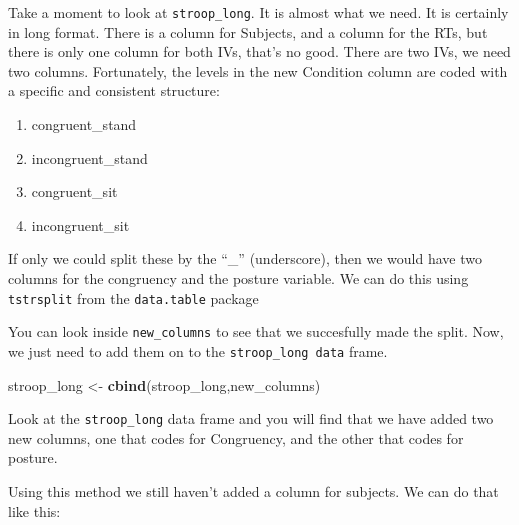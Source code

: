 \documentclass[
]{book}
\newenvironment{Shaded}{\begin{snugshade}}{\end{snugshade}}
\newcommand{\AttributeTok}[1]{\textcolor[rgb]{0.13,0.29,0.53}{#1}}
\newcommand{\FunctionTok}[1]{\textcolor[rgb]{0.13,0.29,0.53}{\textbf{#1}}}
\newcommand{\NormalTok}[1]{#1}
\newcommand{\OtherTok}[1]{\textcolor[rgb]{0.56,0.35,0.01}{#1}}
\newcommand{\SpecialCharTok}[1]{\textcolor[rgb]{0.81,0.36,0.00}{\textbf{#1}}}
\newcommand{\StringTok}[1]{\textcolor[rgb]{0.31,0.60,0.02}{#1}}
\providecommand{\tightlist}{%
  \setlength{\itemsep}{0pt}\setlength{\parskip}{0pt}}
\begin{document}
Take a moment to look at \texttt{stroop\_long}. It is almost what we need. It is certainly in long format. There is a column for Subjects, and a column for the RTs, but there is only one column for both IVs, that's no good. There are two IVs, we need two columns. Fortunately, the levels in the new Condition column are coded with a specific and consistent structure:

\begin{enumerate}
\def\labelenumi{\arabic{enumi}.}
\tightlist
\item
  congruent\_stand
\item
  incongruent\_stand
\item
  congruent\_sit
\item
  incongruent\_sit
\end{enumerate}

If only we could split these by the ``\_'' (underscore), then we would have two columns for the congruency and the posture variable. We can do this using \texttt{tstrsplit} from the \texttt{data.table} package

\begin{Shaded}
\end{Shaded}

You can look inside \texttt{new\_columns} to see that we succesfully made the split. Now, we just need to add them on to the \texttt{stroop\_long\ data} frame.

\begin{Shaded}
\begin{Highlighting}[]
\NormalTok{stroop\_long }\OtherTok{\textless{}{-}} \FunctionTok{cbind}\NormalTok{(stroop\_long,new\_columns)}
\end{Highlighting}
\end{Shaded}

Look at the \texttt{stroop\_long} data frame and you will find that we have added two new columns, one that codes for Congruency, and the other that codes for posture.

Using this method we still haven't added a column for subjects. We can do that like this:
\end{document}

